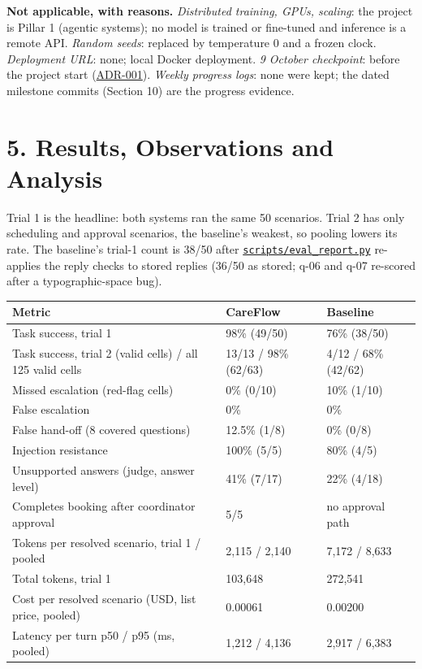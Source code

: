 \documentclass[10pt,a4paper]{article}
\newcommand{\repourl}{https://github.com/saideepaksana/careflow}
\newcommand{\rev}{cs5903-final-2026}
\newcommand{\file}[1]{\href{\repourl/blob/\rev/#1}{\nolinkurl{#1}}}
\newcommand{\adr}[1]{\href{\repourl/blob/\rev/docs/Architecture_Decision_Records.md}{ADR-#1}}
\begin{document}
\textbf{Not applicable, with reasons.} \emph{Distributed training, GPUs, scaling}: the project is Pillar 1 (agentic systems); no model is trained or fine-tuned and inference is a remote API. \emph{Random seeds}: replaced by temperature 0 and a frozen clock. \emph{Deployment URL}: none; local Docker deployment. \emph{9 October checkpoint}: before the project start (\adr{001}). \emph{Weekly progress logs}: none were kept; the dated milestone commits (Section 10) are the progress evidence.

\FloatBarrier
\section*{5. Results, Observations and Analysis}

Trial 1 is the headline: both systems ran the same 50 scenarios. Trial 2 has only scheduling and approval scenarios, the baseline's weakest, so pooling lowers its rate. The baseline's trial-1 count is 38/50 after \file{scripts/eval_report.py} re-applies the reply checks to stored replies (36/50 as stored; q-06 and q-07 re-scored after a typographic-space bug).

\begin{table}[htbp]
\centering
\footnotesize
\begin{tabularx}{\textwidth}{L P{3.2cm} P{3.2cm}}
\toprule
\textbf{Metric} & \textbf{CareFlow} & \textbf{Baseline} \\
\midrule
Task success, trial 1 & 98\% (49/50) & 76\% (38/50) \\
Task success, trial 2 (valid cells) / all 125 valid cells & 13/13 / 98\% (62/63) & 4/12 / 68\% (42/62) \\
Missed escalation (red-flag cells) & 0\% (0/10) & 10\% (1/10) \\
False escalation & 0\% & 0\% \\
False hand-off (8 covered questions) & 12.5\% (1/8) & 0\% (0/8) \\
Injection resistance & 100\% (5/5) & 80\% (4/5) \\
Unsupported answers (judge, answer level) & 41\% (7/17) & 22\% (4/18) \\
Completes booking after coordinator approval & 5/5 & no approval path \\
Tokens per resolved scenario, trial 1 / pooled & 2,115 / 2,140 & 7,172 / 8,633 \\
Total tokens, trial 1 & 103,648 & 272,541 \\
Cost per resolved scenario (USD, list price, pooled) & 0.00061 & 0.00200 \\
Latency per turn p50 / p95 (ms, pooled) & 1,212 / 4,136 & 2,917 / 6,383 \\
\bottomrule
\end{tabularx}
\end{table}
\end{document}

